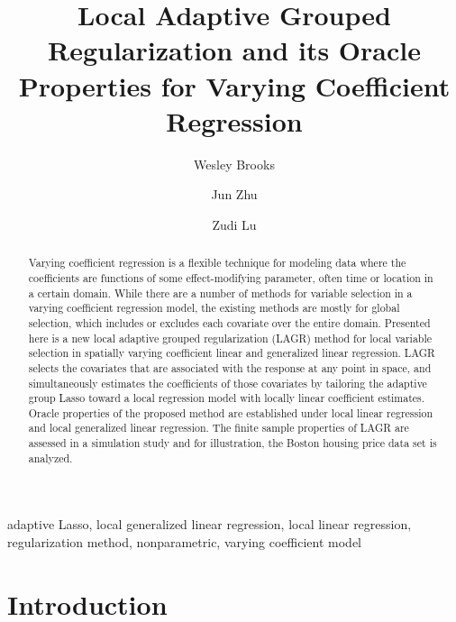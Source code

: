 \documentclass[authoryear,review, 12pt]{elsarticle}
\begin{document}
\begin{frontmatter}

\title{Local Adaptive Grouped Regularization and its Oracle Properties for Varying Coefficient Regression}


\author[wrbrooks]{Wesley Brooks}

\author[jzhu]{Jun Zhu}

\author[zlu]{Zudi Lu}

\address[wrbrooks]{Department of Statistics, University of Wisconsin, Madison, WI 53706}
\address[jzhu]{Department of Statistics and Department of Entomology, University of Wisconsin, Madison, WI 53706}
\address[zlu]{School of Mathematical Sciences, University of Southampton, Highfield, Southampton UK}

\begin{abstract}
Varying coefficient regression is a flexible technique for modeling data where the coefficients are functions of some effect-modifying parameter, often time or location in a certain domain. While there are a number of methods for variable selection in a varying coefficient regression model, the existing methods are mostly for global selection, which includes or excludes each covariate over the entire domain. Presented here is a new local adaptive grouped regularization (LAGR) method for local variable selection in spatially varying coefficient linear and generalized linear regression. LAGR selects the covariates that are associated with the response at any point in space, and simultaneously estimates the coefficients of those covariates by tailoring the adaptive group Lasso toward a local regression model with locally linear coefficient estimates. Oracle properties of the proposed method are established under local linear regression and local generalized linear regression. The finite sample properties of LAGR are assessed in a simulation study and for illustration, the Boston housing price data set is analyzed.
\end{abstract}

\begin{keyword}
adaptive Lasso, local generalized linear regression, local linear regression, regularization method, nonparametric, varying coefficient model
\end{keyword}

\end{frontmatter}

\section{Introduction}
\end{document}
